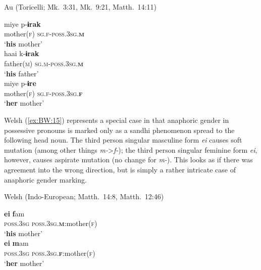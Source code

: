 \documentclass[output=collectionpaper]{langsci/langscibook}
\begin{document}
\ea\label{ex:BW:14}
Au (Toricelli; Mk.~3:31, Mk.~9:21, Matth.~14:11)\\
\begin{xlist}
\ex
\gll miye 	p-\textbf{ɨrak}\\
mother(\textsc{f})	{\textrightarrow\textsc{sg.f-poss.3sg.\textbf{m}}}\\
\glt ‘\textbf{his} mother’\\
\ex
\gll
haai 	k-\textbf{ɨrak}\\
father(\textsc{m})	{\textrightarrow\textsc{sg.m-poss.3sg.\textbf{m}}}\\
\glt ‘\textbf{his} father’\\
\ex
\gll miye 	p-\textbf{ɨre}\\
mother(\textsc{f})	{\textrightarrow\textsc{sg.f-poss.3sg.\textbf{f}}}\\
\glt ‘\textbf{her} mother’\\
\end{xlist}
\z

Welsh (\ref{ex:BW:15}) represents a special case in that anaphoric gender in possessive pronouns is marked only as a sandhi phenomenon spread to the following head noun. The third person singular masculine form \textit{ei} causes soft mutation (among other things \textit{m-}>\textit{f-}); the third person singular feminine form \textit{ei}, however, causes aspirate mutation (no change for \textit{m-}). This looks as if there was agreement into the wrong direction, but is simply a rather intricate case of anaphoric gender marking.

\ea\label{ex:BW:15}
Welsh (Indo-European; Matth.~14:8, Matth.~12:46)\\
\begin{xlist}
\ex
\gll \textbf{ei} 	\textbf{f}am\\
\textsc{poss.3sg}	\textsc{poss.3sg.\textbf{m}}:mother(\textsc{f})\\
\glt ‘\textbf{his} mother’\\
\ex
\gll \textbf{ei} 	\textbf{m}am\\
\textsc{poss.3sg}	\textsc{poss.3sg.\textbf{f}}:mother(\textsc{f})\\
\glt ‘\textbf{her} mother’\\
\end{xlist}
\z
\end{document}
